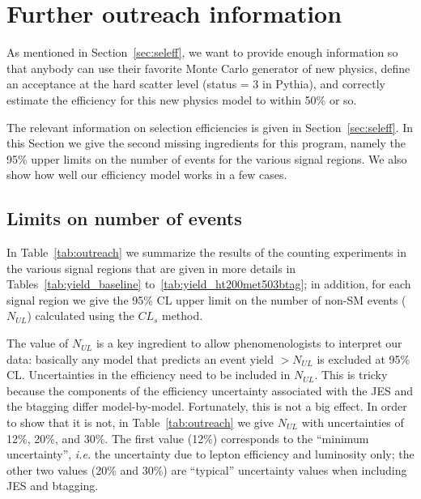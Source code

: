

\section{Further outreach information}
\label{sec:outreach}
As mentioned in Section~\ref{sec:seleff}, we want to provide 
enough information so that anybody can use their favorite Monte Carlo
generator of new physics, define an acceptance at the hard 
scatter level (status = 3 in Pythia), and correctly estimate
the efficiency for this new physics model to within 50\% or so.

The relevant information on selection efficiencies is 
given in Section~\ref{sec:seleff}.  In this Section we give the 
second missing ingredients for this program, namely the 
95\% upper limits on the number of events for the various 
signal regions.  We also show how well our efficiency model 
works in a few cases.

\subsection{Limits on number of events}
\label{sec:outreachlimits}
In Table~\ref{tab:outreach} we summarize the 
results of the counting experiments in the various signal 
regions that are given in more 
details in Tables~\ref{tab:yield_baseline} 
to~\ref{tab:yield_ht200met503btag}; in addition, for each signal 
region we give the 95\% CL upper limit on the number of 
non-SM events ($N_{UL}$) calculated using the $CL_s$ method.

The value of $N_{UL}$ is a key ingredient to allow phenomenologists
to interpret our data: basically any model that predicts an 
event yield $> N_{UL}$ is excluded at 95\% CL.  Uncertainties 
in the efficiency need to be included in $N_{UL}$.  This is tricky 
because the components of the efficiency uncertainty associated 
with the JES and the btagging differ model-by-model.  Fortunately,
this is not a big effect.  In order to show that it is not, in 
Table~\ref{tab:outreach} we give $N_{UL}$ with uncertainties of 
12\%, 20\%, and 30\%. The first value (12\%) corresponds to the 
``minimum uncertainty'', {\em i.e.} the uncertainty due to 
lepton efficiency and luminosity only; the other two values (20\%
and 30\%) are ``typical'' uncertainty values when including
JES and btagging.



